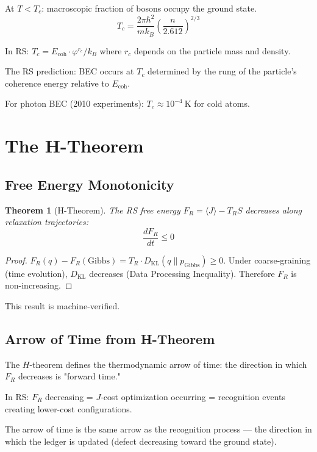 \documentclass[12pt,a4paper]{article}
\newtheorem{theorem}{Theorem}[section]
\theoremstyle{definition}
\theoremstyle{remark}
\begin{document}
At $T < T_c$: macroscopic fraction of bosons occupy the ground state.
\begin{equation}
T_c = \frac{2\pi\hbar^2}{m k_B}\left(\frac{n}{2.612}\right)^{2/3}
\end{equation}

In RS: $T_c = E_\mathrm{coh} \cdot \varphi^{r_c} / k_B$ where $r_c$ depends on the 
particle mass and density.

The RS prediction: BEC occurs at $T_c$ determined by the rung of the particle's 
coherence energy relative to $E_\mathrm{coh}$. 

For photon BEC (2010 experiments): $T_c \approx 10^{-4}~\text{K}$ for cold atoms.

\section{The H-Theorem}

\subsection{Free Energy Monotonicity}

\begin{theorem}[H-Theorem]
The RS free energy $F_R = \langle J \rangle - T_R S$ 
decreases along relaxation trajectories:
\begin{equation}
\frac{dF_R}{dt} \leq 0
\end{equation}
\end{theorem}

\begin{proof}
$F_R(q) - F_R(\text{Gibbs}) = T_R \cdot D_\mathrm{KL}(q \| p_\mathrm{Gibbs}) \geq 0$.
Under coarse-graining (time evolution), $D_\mathrm{KL}$ decreases (Data Processing Inequality).
Therefore $F_R$ is non-increasing.
\end{proof}

This result is machine-verified.

\subsection{Arrow of Time from H-Theorem}

The $H$-theorem defines the thermodynamic arrow of time: 
the direction in which $F_R$ decreases is "forward time."

In RS: $F_R$ decreasing = $J$-cost optimization occurring = recognition events creating 
lower-cost configurations.

The arrow of time is the same arrow as the recognition process — the direction 
in which the ledger is updated (defect decreasing toward the ground state).
\end{document}
